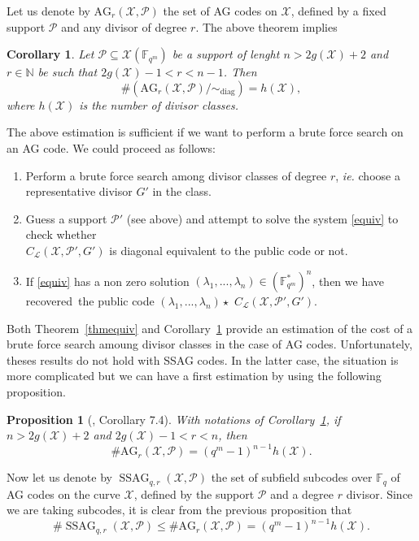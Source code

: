 \documentclass[10pt]{article}
\newtheorem{prop1}[thm]{Proposition}
\newtheorem{coro1}[thm]{Corollary}
\theoremstyle{definition}
\theoremstyle{definition}
\theoremstyle{definition}
\newcommand{\N}{\mathbb{N}}
\newcommand{\fqm}{\mathbb{F}_{q^m}}
\newcommand{\fq}{\mathbb{F}_q}
\newcommand{\su}{\subseteq}
\newcommand{\X}{\mathcal{X}}
\newcommand{\PR}{\mathcal{P}}
\newcommand{\ssag}{\operatorname{SSAG}}
\newcommand{\calL}{\mathcal{L}}
\begin{document}
Let us denote by $\mathrm{AG}_r(\X,\PR)$ the set of AG codes on $\X$, defined by a fixed support $\PR$ and any divisor of degree $r$. The above theorem implies

\begin{coro1} \label{nbAGr}
Let $\PR \su \X(\fqm)$ be a support of lenght $n > 2g(\X)+2$ and $r \in \N$ be such that $2g(\X)-1 < r < n-1$. Then 
\[ \#\left(\mathrm{AG}_r(\X,\PR)/ \sim_{\mathrm{diag}}\right)= h(\X),\]
where $h(\X)$ is the number of divisor classes.
\end{coro1}

The above estimation is sufficient if we want to perform a brute force search on an AG code. We could proceed as follows:
\begin{enumerate}
\item Perform a brute force search among divisor classes of degree $r$, \textit{ie.} choose a representative divisor $G'$ in the class.
\item Guess a support $\PR'$ (see above) and attempt to solve the system \eqref{equiv} to check whether \\ $C_{\calL}(\X,\PR',G')$ is diagonal equivalent to the public code or not.
\item If \eqref{equiv} has a non zero solution $(\lambda_1,...,\lambda_n) \in (\fqm^*)^n$, then we have recovered~the public code $(\lambda_1,...,\lambda_n) \star$ $C_{\calL}(\X,\PR',G')$.
\end{enumerate}

Both Theorem~\ref{thmequiv} and Corollary~\ref{nbAGr} provide an estimation of the cost of a brute force search amoung divisor classes in the case of AG codes. Unfortunately,  theses results do not hold with SSAG codes. In the latter case, the situation is more complicated but we can have a first estimation by using the following proposition.

\begin{prop1}[\cite{CMRP}, Corollary 7.4] 
With notations of Corollary~\ref{nbAGr}, if $n>2g(\X)+2$ and $2g(\X)-1<r<n$, then 
\[\#\mathrm{AG}_r(\X,\PR) = (q^m-1)^{n-1}h(\X).\]
\end{prop1}

Now let us denote by $\ssag_{q,r}(\X,\PR)$ the set of subfield subcodes over $\fq$ of AG codes on the curve $\X$, defined by the support $\PR$ and a degree $r$ divisor. Since we are taking subcodes, it is clear from the previous proposition that 
\[\#\ssag_{q,r}(\X,\PR) \leq \#\mathrm{AG}_r(\X,\PR) = (q^m-1)^{n-1}h(\X).\]
\end{document}
